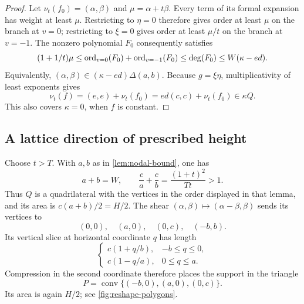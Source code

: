\begin{proof}
Let $\nu_t(f_0)=(\alpha,\beta)$ and $\mu=\alpha+t\beta$. Every term of its formal expansion has weight at least $\mu$. Restricting to $\eta=0$ therefore gives order at least $\mu$ on the branch at $v=0$; restricting to $\xi=0$ gives order at least $\mu/t$ on the branch at $v=-1$.  The nonzero polynomial $F_0$ consequently satisfies
\[
 (1+1/t)\mu
 \le \operatorname{ord}_{v=0}(F_0)+\operatorname{ord}_{v=-1}(F_0)
 \le \deg(F_0)\le W(\kappa-ed).
\]
Equivalently, $(\alpha,\beta)\in(\kappa-ed)\Delta(a,b)$. Because $g=\xi\eta$, multiplicativity of least exponents gives
\[
 \nu_t(f)=(e,e)+\nu_t(f_0)
          =ed(c,c)+\nu_t(f_0)\in\kappa Q.
\]
This also covers $\kappa=0$, when $f$ is constant.
\end{proof}

\subsection{A lattice direction of prescribed height}

Choose $t>T$.  With $a,b$ as in \cref{lem:nodal-bound}, one has
\[
 a+b=W,\qquad
 \frac ca+\frac cb=\frac{(1+t)^2}{Tt}>1.
\]
Thus $Q$ is a quadrilateral with the vertices in the order displayed in that lemma, and its area is $c(a+b)/2=H/2$.  The shear $(\alpha,\beta)\mapsto(\alpha-\beta,\beta)$ sends its vertices to
\[
 (0,0),\quad(a,0),\quad(0,c),\quad(-b,b).
\]
Its vertical slice at horizontal coordinate $q$ has length
\begin{equation}\label{eq:first-slice-length}
 \begin{cases}
 c(1+q/b),&-b\le q\le0,\\
 c(1-q/a),&0\le q\le a.
 \end{cases}
\end{equation}
Compression in the second coordinate therefore places the support in the triangle
\begin{equation}\label{eq:reshape-triangle}
 P=\operatorname{conv}\{(-b,0),(a,0),(0,c)\}.
\end{equation}
Its area is again $H/2$; see \cref{fig:reshape-polygons}.

